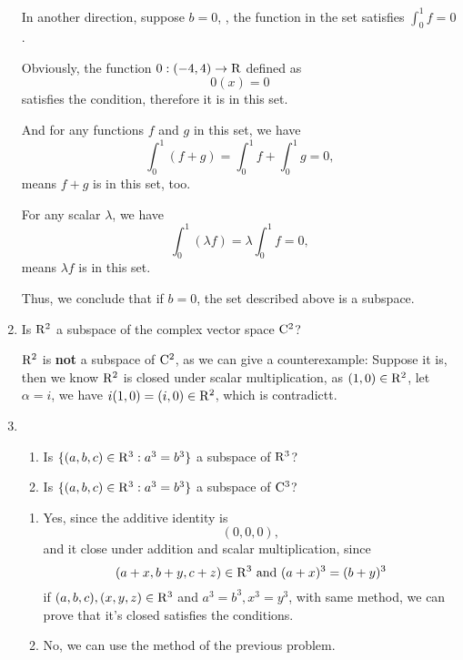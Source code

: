 \begin{enumerate}
\begin{solution}
            In another direction, suppose $b =0$, \ie, the function in the set satisfies $\int_0^1 f = 0$.
            
            Obviously, the function $0: (-4,4) \to \mathrm{R}$ defined as 
            \[ 0(x) = 0\]
            satisfies the condition, therefore it is in this set.

            And for any functions $f$ and $g$ in this set, we have 
            \[ \int_0^1 (f+g) = \int_0^1 f + \int_0^1 g = 0 ,\]
            means $f + g$ is in this set, too.

            For any scalar $\lambda$, we have 
            \[ \int_0^1 (\lambda f) = \lambda \int_0^1 f = 0,\]
            means $\lambda f$ is in this set.

            Thus, we conclude that if $b=0$, the set described above is a subspace.
        \end{solution}
    \item Is $\mathrm{R}^2$ a subspace of the complex vector space $\mathrm{C}^2$?
        \begin{solution}
            $\mathrm{R}^2$ is \textbf{not} a subspace of $\mathrm{C}^2$, as we can give a counterexample: Suppose it is, 
            then we know $\mathrm{R}^2$ is closed under scalar multiplication, as $(1,0) \in \mathrm{R}^2$, let $\alpha = i$, 
            we have $i(1,0) = (i,0) \in \mathrm{R}^2$, which is contradictt.
        \end{solution}
    \item \begin{enumerate}[label=(\alph*)]
            \item Is $\{(a,b,c) \in \mathrm{R}^3: a^3=b^3\}$ a subspace of $\mathrm{R}^3$?
            \item Is $\{(a,b,c) \in \mathrm{R}^3: a^3  = b^3\}$ a subspace of $\mathrm{C}^3$?
        \end{enumerate}
        \begin{solution}
            \begin{enumerate}[label=(\alph*)]
                \item Yes, since the additive identity is
                    \[ (0,0,0) ,\]
                    and it close under addition and scalar multiplication, since 
                    \[ (a+x, b+y, c+z) \in \mathrm{R}^3 \text{ and } (a+x)^3 = (b+y)^3 \]
                    if $(a,b,c), (x,y,z) \in \mathrm{R}^3$ and $a^3=b^3, x^3=y^3$, with same method, we can prove that 
                    it's closed satisfies the conditions.
                \item No, we can use the method of the previous problem.

\end{enumerate}
\end{solution}
\end{enumerate}
